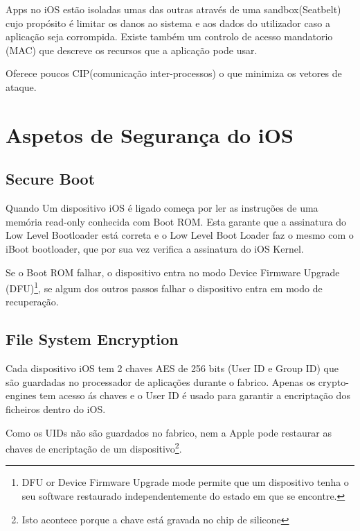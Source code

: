 
\hfill\par
Apps no iOS estão isoladas umas das outras através de uma sandbox(Seatbelt) cujo propósito é limitar os danos ao sistema e aos dados do utilizador caso a aplicação seja corrompida. Existe também um controlo de acesso mandatorio (MAC) que descreve os recursos que a aplicação pode usar.\par

Oferece poucos CIP(comunicação inter-processos) o que minimiza os vetores de ataque.

\section{Aspetos de Segurança do iOS}

\subsection{Secure Boot}
\hfill\par

		Quando Um dispositivo iOS é ligado começa por ler as instruções de uma memória read-only conhecida com Boot ROM.
		Esta garante que a assinatura do Low Level Bootloader está correta e o Low Level Boot Loader faz o mesmo com o iBoot bootloader, que por sua vez verifica a assinatura do iOS Kernel.\par
		Se o Boot ROM falhar, o dispositivo entra no modo Device Firmware Upgrade (DFU)\footnote[1]{DFU or Device Firmware Upgrade mode permite que um dispositivo tenha o seu software restaurado independentemente do estado em que se encontre.}, se algum dos outros passos falhar o dispositivo entra em modo de recuperação.


\subsection{File System Encryption}
\hfill\par
	Cada dispositivo iOS tem 2 chaves AES de 256 bits (User ID e Group ID) que são guardadas no processador de aplicações durante o fabrico. Apenas os crypto-engines tem acesso ás chaves e o User ID é usado para garantir a encriptação dos ficheiros dentro do iOS.\par
	Como os UIDs não são guardados no fabrico, nem a Apple pode restaurar as chaves de encriptação de um dispositivo\footnote[2]{Isto acontece porque a chave está gravada no chip de silicone}.\par


